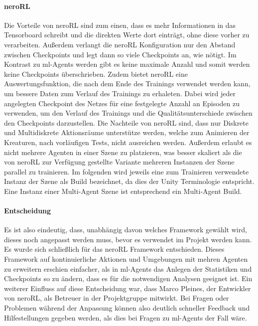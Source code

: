 \paragraph{neroRL}\fup
Die Vorteile von neroRL sind zum einen, dass es mehr Informationen in das Tensorboard schreibt und die direkten Werte dort einträgt, ohne diese vorher zu verarbeiten. Außerdem verlangt die neroRL Konfiguration nur den Abstand zwischen Checkpoints und legt dann so viele Checkpoints an, wie nötigt. Im Kontrast zu ml-Agents werden gibt es keine maximale Anzahl und somit werden keine Checkpoints überschrieben. 
Zudem bietet neroRL eine Auswertungsfunktion, die nach dem Ende des Trainings verwendet werden kann, um bessere Daten zum Verlauf des Trainings zu erhaleten.
Dabei wird jeder angelegten Checkpoint des Netzes für eine festgelegte Anzahl an Episoden zu verwenden, um den Verlauf des Trainings und die Qualitätsunterschiede zwischen den Checkpoints darzustellen.
Die Nachteile von neroRL sind, dass nur Diskrete und Multidiskrete Aktionsräume unterstütze werden, welche zum Animieren der Kreaturen, nach vorläufigen Tests, nicht ausreichen werden. Außerdem erlaubt es nicht mehrere Agenten in einer Szene zu platzieren, was besser skaliert als die von neroRL zur Verfügung gestellte Variante mehreren Instanzen der Szene parallel zu trainieren. Im folgenden wird jeweils eine zum Trainieren verwendete Instanz der Szene als Build bezeichnet, da dies der Unity Terminologie entspricht. Eine Instanz einer Multi-Agent Szene ist entsprechend ein Multi-Agent Build.\\
\paragraph{Entscheidung}\fup
\noindent Es ist also eindeutig, dass, unabhängig davon welches Framework gewählt wird, dieses noch angepasst werden muss, bevor es verwendet im Projekt werden kann. Es wurde sich schließlich für das neroRL Framework entschieden. Dieses Framework auf kontinuierliche Aktionen und Umgebungen mit mehren Agenten zu erweitern erschien einfacher, als in ml-Agents das Anlegen der Statistiken und Checkpoints so zu ändern, dass es für die notwendigen Analysen geeignet ist. 
Ein weiterer Einfluss auf diese Entscheidung war, dass Marco Pleines, der Entwickler von neroRL, als Betreuer in der Projektgruppe mitwirkt. Bei Fragen oder Problemen während der Anpassung können also deutlich schneller Feedback und Hilfestellungen gegeben werden, als dies bei Fragen zu ml-Agents der Fall wäre.

